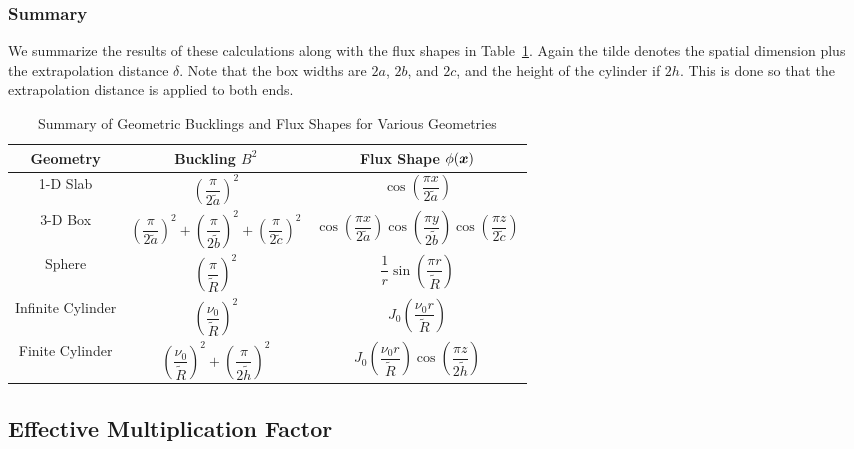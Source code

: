 \subsubsection{Summary}

We summarize the results of these calculations along with the flux shapes in Table~\ref{Table:neutronics_BucklingDifferentGeometries}. Again the tilde denotes the spatial dimension plus the extrapolation distance $\delta$. Note that the box widths are $2a$, $2b$, and $2c$, and the height of the cylinder if $2h$. This is done so that the extrapolation distance is applied to both ends.

\begin{table}[tb!]
\caption{Summary of Geometric Bucklings and Flux Shapes for Various Geometries}
\begin{center}
\begin{tabular}{|c|c|c|} \hline
  Geometry 			& Buckling $B^2$ 						& Flux Shape $\phi(\bm{x})$ 						\\ \hline
  1-D Slab			& $\left( \dfrac{\pi}{2\tilde{a}} \right)^2$	& $\cos\left( \dfrac{\pi x}{2 \tilde{a}} \right)$ 	\\ \hline
  3-D Box			& $\left( \dfrac{\pi}{2\tilde{a}} \right)^2 + \left( \dfrac{\pi}{2\tilde{b}} \right)^2 + \left( \dfrac{\pi}{2\tilde{c}} \right)^2$ 
					& $\cos\left( \dfrac{\pi x}{2 \tilde{a}} \right) \cos\left( \dfrac{\pi y}{2 \tilde{b}} \right) \cos\left( \dfrac{\pi z}{2 \tilde{c}} \right)$ \\ \hline
  Sphere			& $\left( \dfrac{\pi}{\tilde{R}} \right)^2$		& $\dfrac{1}{r} \sin\left( \dfrac{\pi r}{\tilde{R}} \right)$ \\ \hline
  Infinite Cylinder	& $\left( \dfrac{\nu_0}{\tilde{R}} \right)^2$	& $J_0 \left( \dfrac{\nu_0 r}{\tilde{R}} \right)$ \\ \hline
  Finite Cylinder	& $\left( \dfrac{\nu_0}{\tilde{R}} \right)^2 + \left( \dfrac{\pi}{2\tilde{h}} \right)^2$
					& $J_0 \left( \dfrac{\nu_0 r}{\tilde{R}} \right) \cos\left( \dfrac{\pi z}{2\tilde{h}} \right)$ \\ \hline
\end{tabular}
\end{center}
\label{Table:neutronics_BucklingDifferentGeometries}
\end{table}%

\subsection{Effective Multiplication Factor} \label{Sec:neutronics_oneSpeedEffectiveMultipicationFactor}

